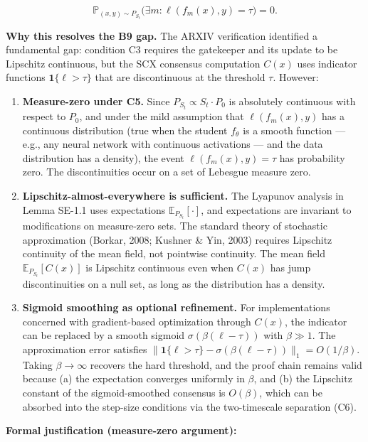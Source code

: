 \documentclass[
  12pt,
]{article}
\begin{document}
\[\mathbb{P}_{(x,y) \sim P_{S_t}}\bigl( \exists m: \ell(f_m(x), y) = \tau \bigr) = 0.\]

\textbf{Why this resolves the B9 gap.} The ARXIV verification identified
a fundamental gap: condition C3 requires the gatekeeper and its update
to be Lipschitz continuous, but the SCX consensus computation \(C(x)\)
uses indicator functions \(\mathbf{1}\{\ell > \tau\}\) that are
discontinuous at the threshold \(\tau\). However:

\begin{enumerate}
\def\labelenumi{\arabic{enumi}.}
\item
  \textbf{Measure-zero under C5.} Since
  \(P_{S_t} \propto S_t \cdot P_0\) is absolutely continuous with
  respect to \(P_0\), and under the mild assumption that
  \(\ell(f_m(x), y)\) has a continuous distribution (true when the
  student \(f_\theta\) is a smooth function --- e.g., any neural network
  with continuous activations --- and the data distribution has a
  density), the event \(\ell(f_m(x), y) = \tau\) has probability zero.
  The discontinuities occur on a set of Lebesgue measure zero.
\item
  \textbf{Lipschitz-almost-everywhere is sufficient.} The Lyapunov
  analysis in Lemma SE-1.1 uses expectations
  \(\mathbb{E}_{P_{S_t}}[\cdot]\), and expectations are invariant to
  modifications on measure-zero sets. The standard theory of stochastic
  approximation (Borkar, 2008; Kushner \& Yin, 2003) requires Lipschitz
  continuity of the mean field, not pointwise continuity. The mean field
  \(\mathbb{E}_{P_{S_t}}[C(x)]\) is Lipschitz continuous even when
  \(C(x)\) has jump discontinuities on a null set, as long as the
  distribution has a density.
\item
  \textbf{Sigmoid smoothing as optional refinement.} For implementations
  concerned with gradient-based optimization through \(C(x)\), the
  indicator can be replaced by a smooth sigmoid
  \(\sigma(\beta(\ell - \tau))\) with \(\beta \gg 1\). The approximation
  error satisfies
  \(\|\mathbf{1}\{\ell > \tau\} - \sigma(\beta(\ell - \tau))\|_1 = O(1/\beta)\).
  Taking \(\beta \to \infty\) recovers the hard threshold, and the proof
  chain remains valid because (a) the expectation converges uniformly in
  \(\beta\), and (b) the Lipschitz constant of the sigmoid-smoothed
  consensus is \(O(\beta)\), which can be absorbed into the step-size
  conditions via the two-timescale separation (C6).
\end{enumerate}

\textbf{Formal justification (measure-zero argument):}
\end{document}
